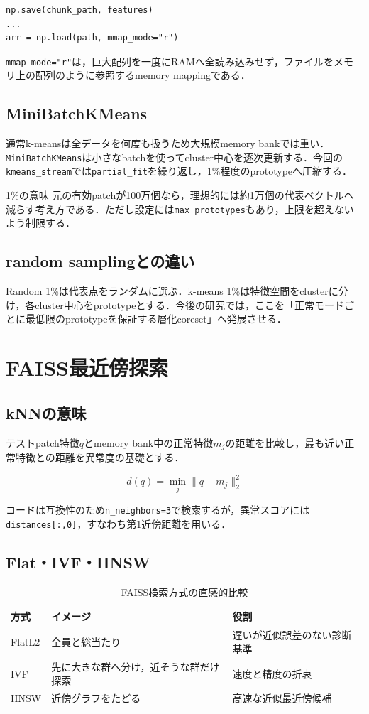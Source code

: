 \documentclass[a4paper,11pt]{ltjsreport}
\begin{document}
\begin{lstlisting}
np.save(chunk_path, features)
...
arr = np.load(path, mmap_mode="r")
\end{lstlisting}

\texttt{mmap\_mode="r"}は，巨大配列を一度にRAMへ全読み込みせず，ファイルをメモリ上の配列のように参照するmemory mappingである．

\section{MiniBatchKMeans}
通常k-meansは全データを何度も扱うため大規模memory bankでは重い．\texttt{MiniBatchKMeans}は小さなbatchを使ってcluster中心を逐次更新する．今回の\texttt{kmeans\_stream}では\texttt{partial\_fit}を繰り返し，1\%程度のprototypeへ圧縮する．

\begin{pointbox}{1\%の意味}
元の有効patchが100万個なら，理想的には約1万個の代表ベクトルへ減らす考え方である．ただし設定には\texttt{max\_prototypes}もあり，上限を超えないよう制限する．
\end{pointbox}

\section{random samplingとの違い}
Random 1\%は代表点をランダムに選ぶ．k-means 1\%は特徴空間をclusterに分け，各cluster中心をprototypeとする．今後の研究では，ここを「正常モードごとに最低限のprototypeを保証する層化coreset」へ発展させる．

\chapter{FAISS最近傍探索}

\section{kNNの意味}
テストpatch特徴\(q\)とmemory bank中の正常特徴\(m_j\)の距離を比較し，最も近い正常特徴との距離を異常度の基礎とする．

\[
d(q)=\min_j \|q-m_j\|_2^2
\]

コードは互換性のため\texttt{n\_neighbors=3}で検索するが，異常スコアには\texttt{distances[:,0]}，すなわち第1近傍距離を用いる．

\section{Flat・IVF・HNSW}
\begin{table}[H]
\centering
\caption{FAISS検索方式の直感的比較}
\begin{tabularx}{\linewidth}{L{25mm} L{38mm} Y}
\toprule
方式 & イメージ & 役割 \\
\midrule
FlatL2 & 全員と総当たり & 遅いが近似誤差のない診断基準 \\
IVF & 先に大きな群へ分け，近そうな群だけ探索 & 速度と精度の折衷 \\
HNSW & 近傍グラフをたどる & 高速な近似最近傍候補 \\
\bottomrule
\end{tabularx}
\end{table}
\end{document}
